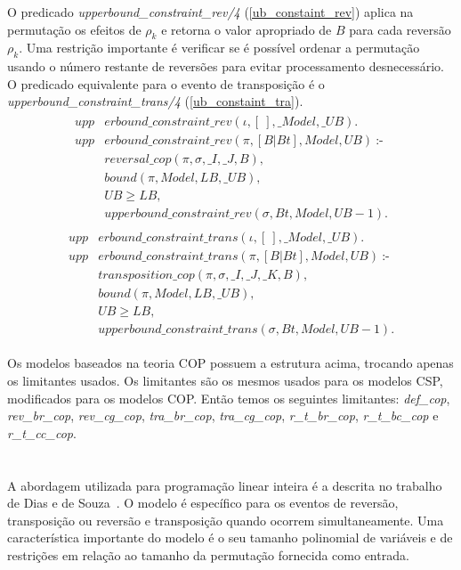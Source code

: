 O predicado \textit{upperbound\_constraint\_rev/4}
(\ref{ub_constaint_rev}) aplica na permutação os efeitos de $\rho_{k}$
e retorna o valor apropriado de $B$ para cada reversão $\rho_{k}$. Uma
restrição importante é verificar se é possível ordenar a permutação
usando o número restante de reversões para evitar processamento
desnecessário. O predicado equivalente para o evento de transposição é
o \textit{upperbound\_constraint\_trans/4} (\ref{ub_constaint_tra}).
\begin{align}
  \label{ub_constaint_rev}
  \begin{split}
  \textit{upp}&\textit{erbound\_constraint\_rev}(\iota, [~], \_Model, \_UB). \\
  \textit{upp}&\textit{erbound\_constraint\_rev}(\pi, [B|Bt], Model, UB)~\text{:-} \\
  &\textit{reversal\_cop}(\pi, \sigma, \_I, \_J, B), \\
  &\textit{bound}(\pi, Model, LB, \_UB), \\
  &UB \ge LB,  \\
  &\textit{upperbound\_constraint\_rev}(\sigma, Bt, Model, UB - 1).
  \end{split}
\end{align}
\begin{align}
  \label{ub_constaint_tra}
  \begin{split}
  \textit{upp}&\textit{erbound\_constraint\_trans}(\iota, [~], \_Model, \_UB). \\
  \textit{upp}&\textit{erbound\_constraint\_trans}(\pi, [B|Bt], Model, UB)~\text{:-} \\
  &\textit{transposition\_cop}(\pi, \sigma, \_I, \_J, \_K, B), \\
  &\textit{bound}(\pi, Model, LB, \_UB), \\
  &UB \ge LB,  \\
  &\textit{upperbound\_constraint\_trans}(\sigma, Bt, Model, UB - 1).
  \end{split}
\end{align}

Os modelos baseados na teoria COP possuem a estrutura acima, trocando
apenas os limitantes usados. Os limitantes são os mesmos usados para
os modelos CSP, modificados para os modelos COP. Então temos os
seguintes limitantes: \textit{def\_cop}, \textit{rev\_br\_cop},
\textit{rev\_cg\_cop}, \textit{tra\_br\_cop}, \textit{tra\_cg\_cop}, 
\textit{r\_t\_br\_cop}, \textit{r\_t\_bc\_cop}
e \textit{r\_t\_cc\_cop}.

\section{\PLI}
\label{sec:pli}
A abordagem utilizada para programação linear inteira é a descrita no
trabalho de Dias e de Souza~\cite{DiasSouza*2007}. O modelo é
específico para os eventos de reversão, transposição ou reversão e
transposição quando ocorrem simultaneamente. Uma característica
importante do modelo é o seu tamanho polinomial de variáveis e de
restrições em relação ao tamanho da permutação fornecida como entrada.

